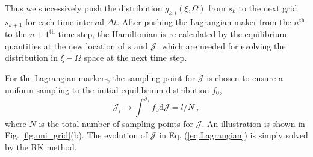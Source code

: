 \documentclass[times,12pt,3p,longtitle]{elsarticle}
\begin{document}
Thus we successively push the distribution $g_{k,l}(\xi,\Omega)$  from  $s_k$ to the next grid $s_{k+1}$ for each time interval $\Delta t$.
After pushing the Lagrangian maker from the $n^\mathrm{th}$ to the $n+1^\mathrm{th}$ time step, the Hamiltonian  is re-calculated by  the  equilibrium quantities  at the new location of $s$ and $\mathcal{J}$, which are needed for evolving the distribution in $\xi-\Omega$ space at the next time step.

For the Lagrangian markers,
the sampling point for $\mathcal{J}$ is chosen to ensure  a uniform sampling to the initial equilibrium distribution $f_0$,
\begin{equation} 
    \mathcal{J}_l \to \int^{\mathcal{J}_l} f_0 \mathrm{d}\mathcal{J} = l/N~, 
\end{equation}
where $N$ is the total number of sampling points for $\mathcal{J}$. An illustration is shown in Fig. \ref{fig.uni_grid}(b).
The evolution of $\mathcal{J}$ in Eq. (\ref{eq.Lagrangian}) is simply solved by  the RK method.
\end{document}

